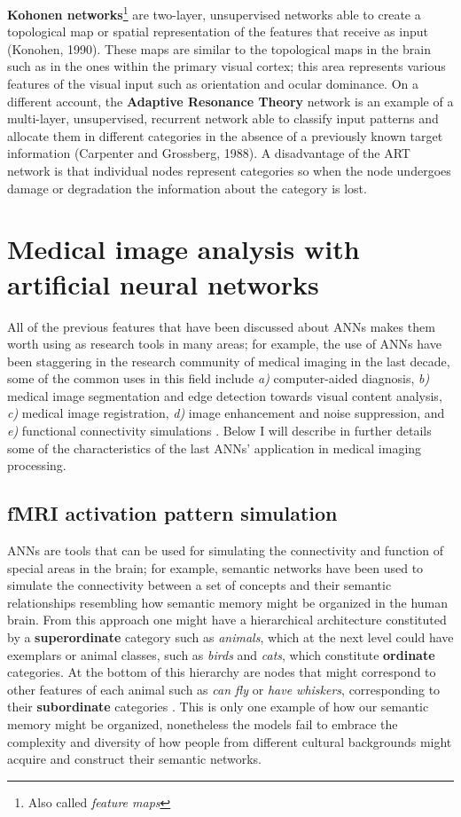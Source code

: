 \documentclass{WileySev}
\begin{document}
\textbf{Kohonen networks}\footnote{Also called \textit{feature maps}} are two-layer, unsupervised networks able to create a topological map or spatial representation of the features that receive as input (Konohen, 1990). These maps are similar to the topological maps in the brain such as in the ones within the primary visual cortex; this area represents various features of the visual input such as orientation and ocular dominance. On a different account, the \textbf{Adaptive Resonance Theory} network is an example of a multi-layer, unsupervised, recurrent network able to classify input patterns and allocate them in different categories in the absence of a previously known target information (Carpenter and Grossberg, 1988). A disadvantage of the ART network is that individual nodes represent categories so when the node undergoes damage or degradation the information about the category is lost.

\section{Medical image analysis with artificial neural networks}

All of the previous features that have been discussed about ANNs makes them worth using as research tools in many areas; for example, the use of ANNs have been staggering in the research community of medical imaging in the last decade, some of the common uses in this field include \textit{a)} computer-aided diagnosis, \textit{b)}  medical image segmentation and edge detection towards visual content analysis, \textit{c)} medical image registration, \textit{d)} image enhancement and noise suppression, and \textit{e)} functional connectivity simulations \cite{jiang2010medical}. Below I will describe in further details some of the characteristics of the last ANNs’ application in medical imaging processing. 

\subsection{fMRI activation pattern simulation}

ANNs are tools that can be used for simulating the connectivity and function of special areas in the brain; for example, semantic networks have been used to simulate the connectivity between a set of concepts and their semantic relationships resembling how semantic memory might be organized in the human brain. From this approach one might have a hierarchical architecture constituted by a \textbf{superordinate} category such as \textit{animals}, which at the next level could have exemplars or animal classes, such as \textit{birds} and \textit{cats}, which constitute  \textbf{ordinate} categories. At the bottom of this hierarchy are nodes that might correspond to other features of each animal such as \textit{can fly} or \textit{have whiskers}, corresponding to their \textbf{subordinate} categories \cite[chap. 7]{friedenberg2011cognitive}. This is only one example of how our semantic memory might be organized, nonetheless the models fail to embrace the complexity and diversity of how people from different cultural backgrounds might acquire and construct their semantic networks.
\end{document}
